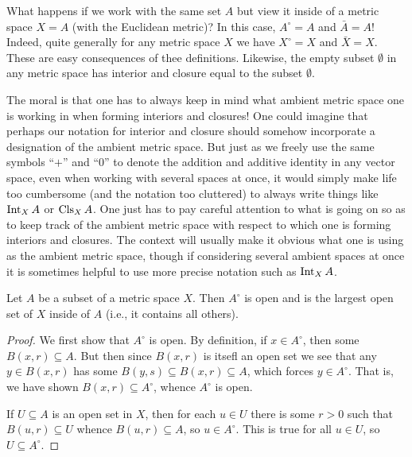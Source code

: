 \begin{example}
  What happens if we work with the same set \(A\) but view it inside of a
  metric space \(X=A\) (with the Euclidean metric)? In this case,
  \(A^\circ=A\) and \(\bar A=A\)! Indeed, quite generally for any metric
  space \(X\) we have \(X^\circ=X\) and \(\bar X=X\). These are easy
  consequences of thee definitions. Likewise, the empty subset
  \(\emptyset\) in any metric space has interior and closure equal to the
  subset \(\emptyset\).

  The moral is that one has to always keep in mind what ambient metric
  space one is working in when forming interiors and closures! One could
  imagine that perhaps our notation for interior and closure should somehow
  incorporate a designation of the ambient metric space. But just as we
  freely use the same symbols ``\(+\)'' and ``\(0\)'' to denote the
  addition and additive identity in any vector space, even when working
  with several spaces at once, it would simply make life too cumbersome
  (and the notation too cluttered) to always write things like \(\operatorname{Int}_X A\)
  or \(\operatorname{Cls}_X A\). One just has to pay careful attention to what is going
  on so as to keep track of the ambient metric space with respect to which
  one is forming interiors and closures. The context will usually make it
  obvious what one is using as the ambient metric space, though if
  considering several ambient spaces at once it is sometimes helpful to use
  more precise notation such as \(\operatorname{Int}_XA\).
\end{example}
\begin{theorem}
  Let \(A\) be a subset of a metric space \(X\). Then \(A^\circ\) is open
  and is the largest open set of \(X\) inside of \(A\) (i.e., it contains
  all others).
\end{theorem}
\begin{proof}
  We first show that \(A^\circ\) is open. By definition, if \(x\in
  A^\circ\), then some \(B(x,r)\subseteq A\). But then since \(B(x,r)\) is
  itsefl an open set we see that any \(y\in B(x,r)\) has some
  \(B(y,s)\subseteq B(x,r)\subseteq A\), which forces \(y\in
  A^\circ\). That is, we have shown \(B(x,r)\subseteq A^\circ\), whence
  \(A^\circ\) is open.

  If \(U\subseteq A\) is an open set in \(X\), then for each \(u\in U\)
  there is some \(r>0\) such that \(B(u,r)\subseteq U\) whence
  \(B(u,r)\subseteq A\), so \(u\in A^\circ\). This is true for all \(u\in
  U\), so \(U\subseteq A^\circ\).
\end{proof}

